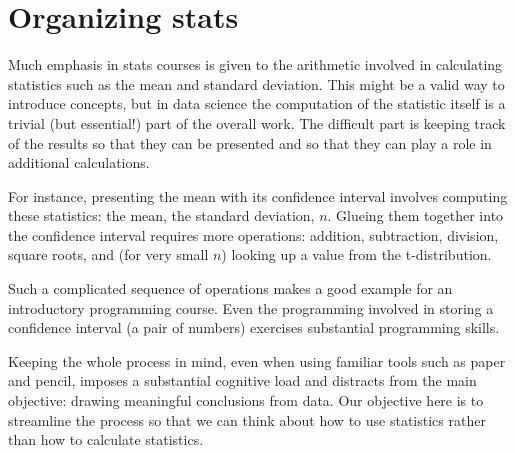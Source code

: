 \documentclass[]{book}
\theoremstyle{definition}
\theoremstyle{definition}
\theoremstyle{definition}
\theoremstyle{remark}
\begin{document}
\chapter{Organizing stats}\label{organizing-stats}

Much emphasis in stats courses is given to the arithmetic involved in
calculating statistics such as the mean and standard deviation. This
might be a valid way to introduce concepts, but in data science the
computation of the statistic itself is a trivial (but essential!) part
of the overall work. The difficult part is keeping track of the results
so that they can be presented and so that they can play a role in
additional calculations.

For instance, presenting the mean with its confidence interval involves
computing these statistics: the mean, the standard deviation, \(n\).
Glueing them together into the confidence interval requires more
operations: addition, subtraction, division, square roots, and (for very
small \(n\)) looking up a value from the t-distribution.

Such a complicated sequence of operations makes a good example for an
introductory programming course. Even the programming involved in
storing a confidence interval (a pair of numbers) exercises substantial
programming skills.

Keeping the whole process in mind, even when using familiar tools such
as paper and pencil, imposes a substantial cognitive load and distracts
from the main objective: drawing meaningful conclusions from data. Our
objective here is to streamline the process so that we can think about
how to use statistics rather than how to calculate statistics.


\end{document}

